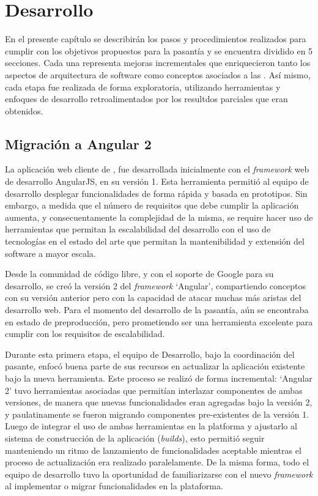 \chapter{Desarrollo}

En el presente capítulo se describirán los pasos y procedimientos realizados para cumplir con los objetivos propuestos para la pasantía y se encuentra dividido en 5 secciones. Cada una representa mejoras incrementales que enriquecieron tanto los aspectos de arquitectura de software como conceptos asociados a las \pwas. Así mismo, cada etapa fue realizada de forma exploratoria, utilizando herramientas y enfoques de desarrollo retroalimentados por los resultdos parciales que eran obtenidos.

\section{Migración a Angular 2}

La aplicación web cliente de \business, fue desarrollada inicialmente con el \textit{framework} web de desarrollo AngularJS, en su versión 1. Esta herramienta permitió al equipo de desarrollo desplegar funcionalidades de forma rápida y basada en prototipos. Sin embargo, a medida que el número de requisitos que debe cumplir la aplicación aumenta, y consecuentamente la complejidad de la misma, se require hacer uso de herramientas que permitan la escalabilidad del desarrollo con el uso de tecnologías en el estado del arte que permitan la mantenibilidad y extensión del software a mayor escala.

Desde la comunidad de código libre, y con el soporte de Google para su desarrollo, se creó la versión 2 del \textit{framework} `Angular', compartiendo conceptos con su versión anterior pero con la capacidad de atacar muchas más aristas del desarrollo web. Para el momento del desarrollo de la pasantía, aún se encontraba en estado de preproducción, pero prometiendo ser una herramienta excelente para cumplir con los requisitos de escalabilidad.

Durante esta primera etapa, el equipo de Desarrollo, bajo la coordinación del pasante, enfocó buena parte de sus recursos en actualizar la aplicación existente bajo la nueva herramienta. Este proceso se realizó de forma incremental: `Angular 2' tuvo herramientas asociadas que permitían interlazar componentes de ambas versiones, de manera que nuevas funcionalidades eran agregadas bajo la versión 2, y paulatinamente se fueron migrando componentes pre-existentes de la versión 1. Luego de integrar el uso de ambas herramientas en la platforma y ajustarlo al sistema de construcción de la aplicación (\textit{builds}), esto permitió seguir manteniendo un ritmo de lanzamiento de funcionalidades aceptable mientras el proceso de actualización era realizado paralelamente. De la misma forma, todo el equipo de desarrollo tuvo la oportunidad de familiarizarse con el nuevo \textit{framework} al implementar o migrar funcionalidades en la plataforma.

